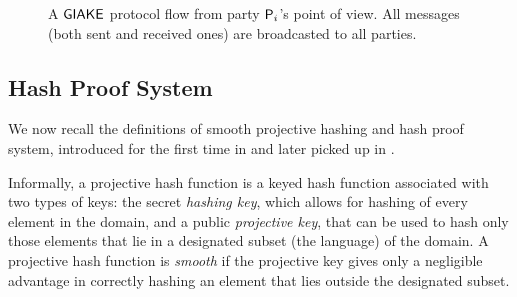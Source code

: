 \begin{figure}
	\centering 

		\caption{A $\GIAKE$ protocol flow from party $\User[i]$'s point of view. All messages (both sent and received ones) are broadcasted to all parties.}\label{fig:giakeprocedure}
\end{figure}

\subsection{Hash Proof System}\label{subsec:HPF}
We now recall the definitions of smooth projective hashing and hash proof system, introduced for the first time in \cite{CS02} and later picked up in \cite{JKRS20}.

Informally, a projective hash function is a keyed hash function associated with two types of keys: the secret \textit{hashing key}, which allows for hashing of every element in the domain, and a public \textit{projective key}, that can be used to hash only those elements that lie in a designated subset (the language) of the domain.
A projective hash function is \textit{smooth} if the projective key gives only a negligible advantage in correctly hashing an element that lies outside the designated subset.

